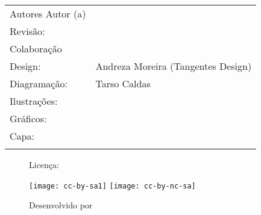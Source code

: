 {\begin{titlingpage}
\begin{tabular}{p{}p{}}
			\ifdefined\la@autores Autores \else Autor (a) \fi  & \ifdefined\la@autores \la@autores@table \else \la@autor \fi             \\

			\ifrevisao
			Revisão:                                           &  \la@revisao            \\
			\fi

			\ifdefined\la@colaboracao
			Colaboração                                        & \la@colaboracao                                                         \\
			\else\fi

			Design:                                            & Andreza Moreira (Tangentes Design)                                    \\

			Diagramação:                                       & Tarso Caldas                                                          \\

			\ifdefined\la@ilustracao
			Ilustrações:                                       & \la@ilustracao                                                          \\
			\else\fi

			\ifdefined\la@graficos
			Gráficos:                                          & \la@graficos                                                            \\
			\else\fi

			\ifdefined\la@autorcapa
			Capa:                                              & \la@autorcapa                                                           \\
			\else\fi
		\end{tabular}

		\vfill
		\begin{figure}[b]
			\begin{minipage}[l]{5cm}
				\centering

				{\large Licença:}

				\vspace{1em}

				\ifdefined\la@ccbysa
					\texttt{[image: cc-by-sa1]}
				\else
					\texttt{[image: cc-by-nc-sa]}
				\fi

			\end{minipage}\hfill
			\begin{minipage}[c]{5cm}
				\centering
				{\large Desenvolvido por}


\end{minipage}
\end{figure}
\end{titlingpage}}
